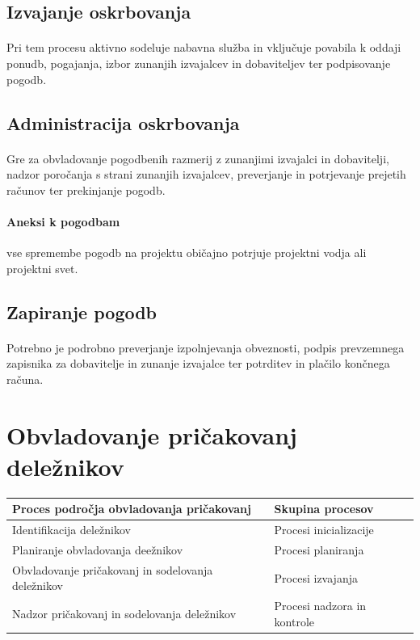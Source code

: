 \documentclass[a4paper,12pt]{report}
\begin{document}
      \subsection{Izvajanje oskrbovanja}
         \paragraph{} Pri tem procesu aktivno sodeluje nabavna služba in vključuje povabila k oddaji ponudb, pogajanja, izbor zunanjih izvajalcev in dobaviteljev ter podpisovanje pogodb.
      \subsection{Administracija oskrbovanja}
         \paragraph{} Gre za obvladovanje pogodbenih razmerij z zunanjimi izvajalci in dobavitelji, nadzor poročanja s strani zunanjih izvajalcev, preverjanje in potrjevanje prejetih računov ter prekinjanje pogodb.
         \paragraph{Aneksi k pogodbam} vse spremembe pogodb na projektu običajno potrjuje projektni vodja ali projektni svet.
      \subsection{Zapiranje pogodb}
         \paragraph{} Potrebno je podrobno preverjanje izpolnjevanja obveznosti, podpis prevzemnega zapisnika za dobavitelje in zunanje izvajalce ter potrditev in plačilo končnega računa.

   \section{Obvladovanje pričakovanj deležnikov}
      \begin{center}
         \begin{tabular}{|l|l|}
            \hline
            \textbf{Proces področja obvladovanja pričakovanj} & \textbf{Skupina procesov} \\
            \hline
            \hline
            Identifikacija deležnikov & Procesi inicializacije \\
            \hline
            Planiranje obvladovanja deežnikov & Procesi planiranja \\
            \hline
            Obvladovanje pričakovanj in sodelovanja deležnikov & Procesi izvajanja \\
            \hline
            Nadzor pričakovanj in sodelovanja deležnikov & Procesi nadzora in kontrole \\
            \hline
         \end{tabular}
      \end{center}
\end{document}
